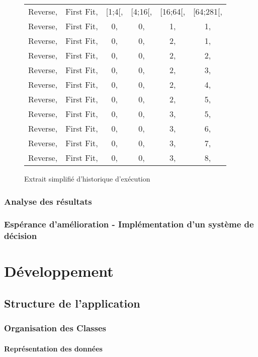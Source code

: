 \documentclass[a4paper,10pt]{report}
\begin{document}
\begin{figure}[ht]
  \begin{tabular}{cccccc}
    Reverse,&First Fit,&[1;4[,&[4;16[,&[16;64[,&[64;281[,\\
    Reverse,&First Fit,&0,    &0,     &1,      &1,\\
    Reverse,&First Fit,&0,    &0,     &2,      &1,\\
    Reverse,&First Fit,&0,    &0,     &2,      &2,\\
    Reverse,&First Fit,&0,    &0,     &2,      &3,\\
    Reverse,&First Fit,&0,    &0,     &2,      &4,\\
    Reverse,&First Fit,&0,    &0,     &2,      &5,\\
    Reverse,&First Fit,&0,    &0,     &3,      &5,\\
    Reverse,&First Fit,&0,    &0,     &3,      &6,\\
    Reverse,&First Fit,&0,    &0,     &3,      &7,\\
    Reverse,&First Fit,&0,    &0,     &3,      &8,\\
  \end{tabular}
  \label{a280-sample-interval-simple}
  \caption{Extrait simplifié d'historique d'exécution}
\end{figure}

\pagebreak
\section{Analyse des résultats}

\section{Espérance d'amélioration - Implémentation d'un système de décision}

\part{Développement}
\chapter{Structure de l'application}
\section{Organisation des Classes}
\subsection{Représentation des données}
\end{document}
